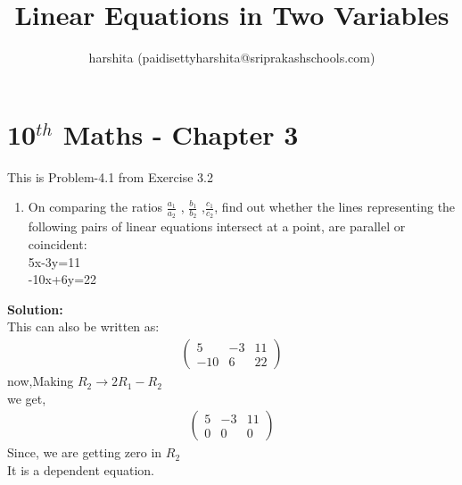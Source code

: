 \documentclass[12pt]{article}
\title{Linear Equations in Two Variables}
\author{harshita (paidisettyharshita@sriprakashschools.com)}
\newcommand{\myvec}[1]{\ensuremath{\begin{pmatrix}#1\end{pmatrix}}}
\newcommand{\solution}{\noindent \textbf{Solution: }}
\begin{document}
\maketitle
\section*{10$^{th}$ Maths - Chapter 3}
This is Problem-4.1 from Exercise 3.2
\begin{enumerate}
\item On comparing the ratios $\frac{a_1}{a_2}$ , $\frac{b_1}{b_2}$ ,$\frac{c_1}{c_2}$, find out whether the lines representing the following pairs of linear equations intersect at a point, are parallel or coincident:\\
5x-3y=11\\ 
-10x+6y=22\\
\end{enumerate}
\solution\\
This can also be written as:
\begin{align}
\myvec{5&-3&11\\-10&6&22}
\end{align}
now,Making $R_2 \xrightarrow\ 2R_1 - R_2$\\ 
we get,
\begin{align}
\myvec{5&-3&11\\0&0&0}
\end{align}
Since, we are getting zero in $R_2$\\
It is a dependent equation.
\end{document}
